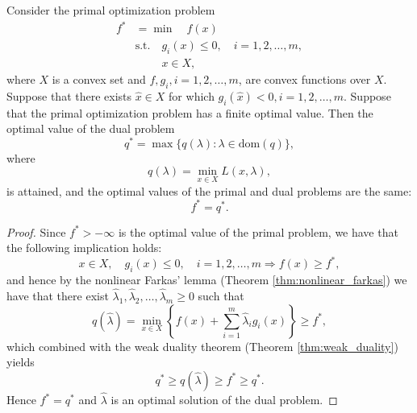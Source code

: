 \documentclass[10pt,a4paper]{article}
\begin{document}
\begin{theorem}
	Consider the primal optimization problem
	\begin{equation*}
		\begin{aligned}
			f^* &= \min \quad f(x) \\
			&\text{s.t.} \quad g_i(x) \leq 0, \quad i = 1, 2, \ldots, m, \\
			&\phantom{\text{s.t.}} \quad x \in X,
		\end{aligned}
	\end{equation*}
	where $X$ is a convex set and $f, g_i, i = 1, 2, \ldots, m$, are convex functions over $X$. Suppose that
	there exists $\hat{x} \in X$ for which $g_i(\hat{x}) < 0, i = 1, 2, \ldots, m$. Suppose that the primal optimization problem has a finite optimal value. Then the optimal value of the dual problem
	\begin{equation*}
		q^* = \max\{q(\lambda) : \lambda \in \text{dom}(q)\},
	\end{equation*}
	where
	\begin{equation*}
		q(\lambda) = \min_{x \in X} L(x, \lambda),
	\end{equation*}
	is attained, and the optimal values of the primal and dual problems are the same:
	\begin{equation*}
		f^* = q^*.
	\end{equation*}
\end{theorem}

\begin{proof}
	Since $f^* > -\infty$ is the optimal value of the primal problem, we have that the following implication holds:
	\begin{equation*}
		x \in X, \quad g_i(x) \leq 0, \quad i = 1, 2, \ldots, m \Rightarrow f(x) \geq f^*,
	\end{equation*}
	and hence by the nonlinear Farkas' lemma (Theorem \eqref{thm:nonlinear_farkas}) we have that there exist
	$\hat{\lambda}_1, \hat{\lambda}_2, \ldots, \hat{\lambda}_m \geq 0$ such that
	\begin{equation*}
		q(\hat{\lambda}) = \min_{x \in X} \left\{ f(x) + \sum_{i=1}^{m} \hat{\lambda}_i g_i(x) \right\} \geq f^*,
	\end{equation*}
	which combined with the weak duality theorem (Theorem \ref{thm:weak_duality}) yields
	\begin{equation*}
		q^* \geq q(\hat{\lambda}) \geq f^* \geq q^*.
	\end{equation*}
	Hence $f^* = q^*$ and $\hat{\lambda}$ is an optimal solution of the dual problem.
\end{proof}
\end{document}
